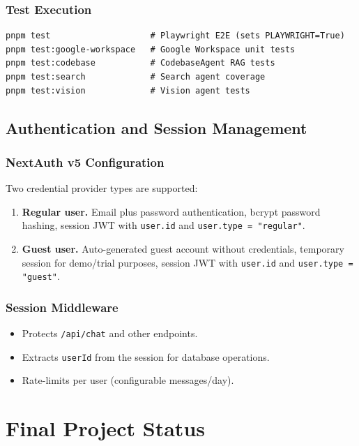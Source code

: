 \documentclass[11pt,a4paper]{report}
\newcommand{\code}[1]{\texttt{\small #1}}
\begin{document}
\subsubsection{Test Execution}

\begin{lstlisting}[style=shstyle]
pnpm test                    # Playwright E2E (sets PLAYWRIGHT=True)
pnpm test:google-workspace   # Google Workspace unit tests
pnpm test:codebase           # CodebaseAgent RAG tests
pnpm test:search             # Search agent coverage
pnpm test:vision             # Vision agent tests
\end{lstlisting}

\subsection{Authentication and Session Management}

\subsubsection{NextAuth v5 Configuration}

Two credential provider types are supported:

\begin{enumerate}
  \item \textbf{Regular user.} Email plus password authentication, bcrypt password hashing, session JWT with \code{user.id} and \code{user.type = "regular"}.
  \item \textbf{Guest user.} Auto-generated guest account without credentials, temporary session for demo/trial purposes, session JWT with \code{user.id} and \code{user.type = "guest"}.
\end{enumerate}

\subsubsection{Session Middleware}

\begin{itemize}
  \item Protects \code{/api/chat} and other endpoints.
  \item Extracts \code{userId} from the session for database operations.
  \item Rate-limits per user (configurable messages/day).
\end{itemize}

\section{Final Project Status}
\end{document}
